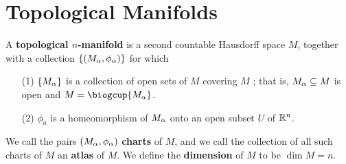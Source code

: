 \section{Topological Manifolds}

\begin{definition}
    A \textbf{topological $n$-manifold} is a second countable Hausdorff space
    $M$, together with a collection  $\{(M_\alpha,\phi_\alpha)\}$ for which
    \begin{enumerate}
        \item[(1)] $\{M_\alpha\}$ is a collection of open sets of $M$ covering $M$ ;
            that is, $M_\alpha \subseteq M$ is open and  $M=\biogcup{M_\a}$.

        \item[(2)] $\phi_a$ is a homeomorphism of  $M_\alpha$ onto an open subset
            $U$ of  $\mathbb{R}^n$.
    \end{enumerate}
    We call the pairs $(M_\alpha,\phi_\alpha)$ \textbf{charts} of $M$, and we call the
    collection of all such charts of $M$ an  \textbf{atlas} of $M$. We define
    the  \textbf{dimension} of $M$ to be  $\dim{M}=n$.
\end{definition}

